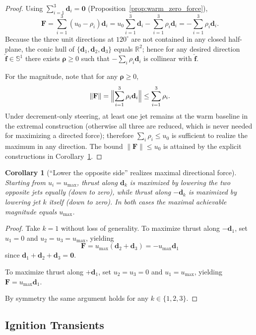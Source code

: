 \documentclass{article}
\newtheorem{corollary}{Corollary}
\begin{document}
\begin{proof}
Using $\sum_{i=1}^3 \mathbf d_i=\mathbf 0$ (Proposition~\ref{prop:warm_zero_force}),
\[
\mathbf F=\sum_{i=1}^3 (u_0-\rho_i)\mathbf d_i
= u_0\sum_{i=1}^3 \mathbf d_i-\sum_{i=1}^3\rho_i\mathbf d_i
= -\sum_{i=1}^3\rho_i\mathbf d_i.
\]
Because the three unit directions at $120^\circ$ are not contained in any closed half-plane, the
conic hull of $\{\mathbf d_1,\mathbf d_2,\mathbf d_3\}$ equals $\mathbb R^2$; hence for any desired
direction $\hat{\mathbf f}\in\mathbb S^1$ there exists $\bm\rho\ge 0$ such that
$-\sum_i\rho_i\mathbf d_i$ is collinear with $\hat{\mathbf f}$.

For the magnitude, note that for any $\bm\rho\ge 0$,
\[
\|\mathbf F\|
=\Bigl\|\sum_{i=1}^3\rho_i\mathbf d_i\Bigr\|
\le \sum_{i=1}^3 \rho_i.
\]
Under decrement-only steering, at least one jet remains at the warm baseline in the extremal
construction (otherwise all three are reduced, which is never needed for maximizing a directed
force); therefore $\sum_i\rho_i\le u_0$ is sufficient to realize the maximum in any direction.
The bound $\|\mathbf F\|\le u_0$ is attained by the explicit constructions in
Corollary~\ref{cor:lower_opposite_max}.
\end{proof}

\begin{corollary}[``Lower the opposite side'' realizes maximal directional force]
\label{cor:lower_opposite_max}
Starting from $u_i=u_{\max}$, thrust along $\mathbf d_k$ is maximized by lowering the two opposite
jets equally (down to zero), while thrust along $-\mathbf d_k$ is maximized by lowering jet $k$
itself (down to zero). In both cases the maximal achievable magnitude equals $u_{\max}$.
\end{corollary}

\begin{proof}
Take $k=1$ without loss of generality.
To maximize thrust along $-\mathbf d_1$, set $u_1=0$ and $u_2=u_3=u_{\max}$, yielding
\[
\mathbf F=u_{\max}(\mathbf d_2+\mathbf d_3)=-u_{\max}\mathbf d_1
\]
since $\mathbf d_1+\mathbf d_2+\mathbf d_3=\mathbf 0$.

To maximize thrust along $+\mathbf d_1$, set $u_2=u_3=0$ and $u_1=u_{\max}$, yielding
$\mathbf F=u_{\max}\mathbf d_1$.

By symmetry the same argument holds for any $k\in\{1,2,3\}$.
\end{proof}


\subsection{Ignition Transients}
\label{subsec:transients}
\end{document}
